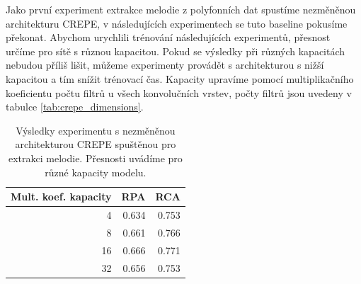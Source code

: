Jako první experiment extrakce melodie z polyfonních dat spustíme nezměněnou architekturu CREPE, v následujících experimentech se tuto baseline pokusíme překonat. Abychom urychlili trénování následujících experimentů, přesnost určíme pro sítě s různou kapacitou. Pokud se výsledky při různých kapacitách nebudou příliš lišit, můžeme experimenty provádět s architekturou s nižší kapacitou a tím snížit trénovací čas. Kapacity upravíme pomocí multiplikačního koeficientu počtu filtrů u všech konvolučních vrstev, počty filtrů jsou uvedeny v tabulce \ref{tab:crepe_dimensions}.


\begin{table}[h!]

\centering

\begin{tabular}{rrr}
\toprule
Mult. koef. kapacity &   RPA &   RCA \\
\midrule
                   4 & 0.634 & 0.753 \\
                   8 & 0.661 & 0.766 \\
                  16 & 0.666 & 0.771 \\
                  32 & 0.656 & 0.753 \\
\bottomrule
\end{tabular}
\caption{Výsledky experimentu s nezměněnou architekturou CREPE spuštěnou pro extrakci melodie. Přesnosti uvádíme pro různé kapacity modelu.}\label{tab:crepe_capacity_experiment}
\end{table}


